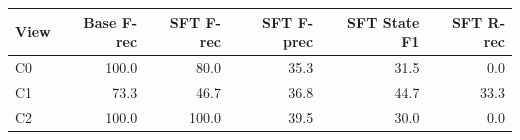 \begin{tabular}{lrrrrr}
\toprule
View & Base F-rec & SFT F-rec & SFT F-prec & SFT State F1 & SFT R-rec \\
\midrule
C0 & 100.0 & 80.0 & 35.3 & 31.5 & 0.0 \\
C1 & 73.3 & 46.7 & 36.8 & 44.7 & 33.3 \\
C2 & 100.0 & 100.0 & 39.5 & 30.0 & 0.0 \\
\bottomrule
\end{tabular}
